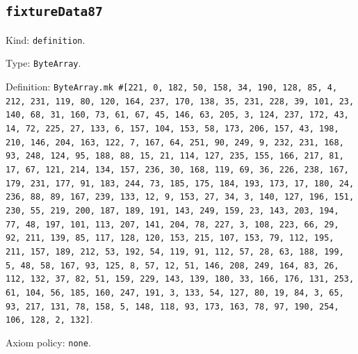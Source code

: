 \documentclass[11pt]{article}
\begin{document}
\subsection*{\texttt{fixtureData87}}
\noindent Kind: \texttt{definition}.\par
\noindent Type: \texttt{ByteArray}.\par
\noindent Definition: \texttt{ByteArray.mk \#[221, 0, 182, 50, 158, 34, 190, 128, 85, 4, 212, 231, 119, 80, 120, 164, 237, 170, 138, 35, 231, 228, 39, 101, 23, 140, 68, 31, 160, 73, 61, 67, 45, 146, 63, 205, 3, 124, 237, 172, 43, 14, 72, 225, 27, 133, 6, 157, 104, 153, 58, 173, 206, 157, 43, 198, 210, 146, 204, 163, 122, 7, 167, 64, 251, 90, 249, 9, 232, 231, 168, 93, 248, 124, 95, 188, 88, 15, 21, 114, 127, 235, 155, 166, 217, 81, 17, 67, 121, 214, 134, 157, 236, 30, 168, 119, 69, 36, 226, 238, 167, 179, 231, 177, 91, 183, 244, 73, 185, 175, 184, 193, 173, 17, 180, 24, 236, 88, 89, 167, 239, 133, 12, 9, 153, 27, 34, 3, 140, 127, 196, 151, 230, 55, 219, 200, 187, 189, 191, 143, 249, 159, 23, 143, 203, 194, 77, 48, 197, 101, 113, 207, 141, 204, 78, 227, 3, 108, 223, 66, 29, 92, 211, 139, 85, 117, 128, 120, 153, 215, 107, 153, 79, 112, 195, 211, 157, 189, 212, 53, 192, 54, 119, 91, 112, 57, 28, 63, 188, 199, 5, 48, 58, 167, 93, 125, 8, 57, 12, 51, 146, 208, 249, 164, 83, 26, 112, 132, 37, 82, 51, 159, 229, 143, 139, 180, 33, 166, 176, 131, 253, 61, 104, 56, 185, 160, 247, 191, 3, 133, 54, 127, 80, 19, 84, 3, 65, 93, 217, 131, 78, 158, 5, 148, 118, 93, 173, 163, 78, 97, 190, 254, 106, 128, 2, 132]}.\par
\noindent Axiom policy: \texttt{none}.\par
\end{document}
